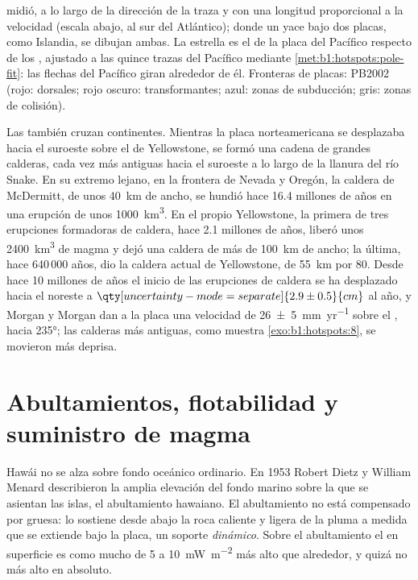 \begin{omfigure}
{midió, a lo largo de la dirección de la traza y con una longitud proporcional a la velocidad (escala abajo, al sur del Atlántico); donde un  yace bajo dos placas, como Islandia, se dibujan ambas. La estrella es el  de la placa del Pacífico respecto de los , ajustado a las quince trazas del Pacífico mediante \cref{met:b1:hotspots:pole-fit}: las flechas del Pacífico giran alrededor de él. Fronteras
de placas: PB2002 (rojo: dorsales; rojo oscuro: transformantes; azul: zonas de subducción; gris: zonas de colisión).}
\label{fig:b1:hotspots:map}
\end{omfigure}


Las  también cruzan continentes. Mientras la placa norteamericana se desplazaba hacia el suroeste sobre el  de
Yellowstone, se formó una cadena de grandes calderas, cada vez más antiguas hacia el suroeste a lo largo de la llanura del río Snake. En su extremo
lejano, en la frontera de Nevada y Oregón, la caldera de McDermitt, de unos \qty{40}{km} de ancho, se hundió hace 16.4 millones de años en una erupción
de unos \qty{1000}{km^3}. En el propio Yellowstone, la primera de tres erupciones formadoras de caldera, hace 2.1 millones de años, liberó unos
\qty{2400}{km^3} de magma y dejó una caldera de más de \qty{100}{km} de ancho; la última, hace 640\,000 años, dio la caldera actual de Yellowstone, de
\qty{55}{km} por 80. Desde hace 10 millones de años el inicio de las erupciones de caldera se ha desplazado hacia el noreste a
$\qty[uncertainty-mode=separate]{2.9 \pm 0.5}{cm}$ al año, y Morgan y Morgan dan a la placa una velocidad de
\qty[uncertainty-mode=separate]{26 \pm 5}{mm.yr^{-1}} sobre el , hacia \ang{235}; las calderas más antiguas, como muestra
\cref{exo:b1:hotspots:8}, se movieron más deprisa.

\section{Abultamientos, flotabilidad y suministro de magma}\label{sec:b1:hotspots:swells}

Hawái no se alza sobre fondo oceánico ordinario. En 1953 Robert Dietz y William Menard describieron la amplia elevación del fondo marino sobre la que
se asientan las islas, el abultamiento hawaiano. El abultamiento no está compensado por  gruesa: lo sostiene desde abajo la roca caliente y ligera
de la pluma a medida que se extiende bajo la placa, un soporte \emph{dinámico}. Sobre el abultamiento el  en superficie es como mucho de 5 a
\qty{10}{mW.m^{-2}} más alto que alrededor, y quizá no más alto en absoluto.

